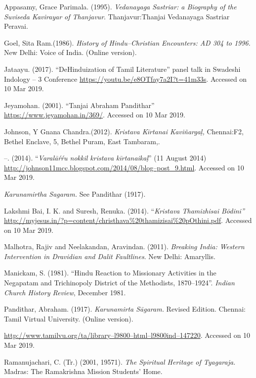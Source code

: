 \begin{thebibliography}{99}
\itemsep=0pt
 Appasamy, Grace Parimala. (1995). \textit{Vedanayaga Sastriar: a Biography of the Suviseda Kavirayar of Thanjavur}. Thanjavur:Thanjai Vedanayaga Sastriar Peravai.

  Goel, Sita Ram.(1986).\textit{ History of Hindu–Christian Encounters: AD 304 to 1996. }New Delhi: Voice of India. (Online version).

  Jataayu. (2017). “DeHinduization of Tamil Literature” panel talk in Swadeshi Indology – 3 Conference \url{https://youtu.be/e8OTfay7a2I?t=41m33s}. Accessed on 10 Mar 2019.

  Jeyamohan. (2001). “Tanjai Abraham Pandithar” \url{https://www.jeyamohan.in/369/}. Accessed on 10 Mar 2019.

  Johnson, Y Gnana Chandra.(2012).\textit{ Kristava Kīrtanai Kaviñargaḷ, }Chennai:F2, Bethel Enclave, 5, Bethel Puram, East Tambaram,.

  –. (2014). “\textit{Varalāŕŕu nokkil kristava kīrtanaikaḷ}” (11 August 2014) \url{http://johnson11mcc.blogspot.com/2014/08/blog–post_9.html}. Accessed on 10 Mar 2019.

  \textit{Karunamirtha Sagaram. }See Pandithar (1917).

  Lakshmi Bai, I. K. and Suresh, Renuka. (2014). “\textit{Kristava Thamizhisai Bōdini”} \url{http://myjesus.in/?p=content/christhava%20thamizisai%20pOthini.pdf}. Accessed on 10 Mar 2019.

  Malhotra, Rajiv and Neelakandan, Aravindan. (2011). \textit{Breaking India: Western Intervention in Dravidian and Dalit Faultlines}. New Delhi: Amaryllis.

  Manickam, S. (1981). “Hindu Reaction to Missionary Activities in the Negapatam and Trichinopoly District of the Methodists, 1870–1924”. \textit{Indian Church History Review}, December 1981.

  Pandithar, Abraham. (1917). \textit{Karunamirta Sāgaram. }Revised Edition. Chennai: Tamil Virtual University. (Online version).

  \url{http://www.tamilvu.org/ta/library–l9800–html–l9800ind–147220}. Accessed on 10 Mar 2019.

  Ramanujachari, C. (Tr.) (2001, 19571). \textit{The Spiritual Heritage of Tyagaraja. }Madras: The Ramakrishna Mission Students’ Home.


\end{thebibliography}
